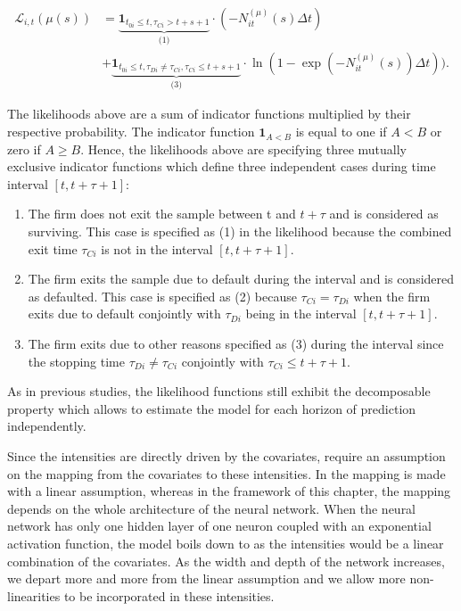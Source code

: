 \begin{align} \label{small_lik_h}
\mathcal{L}_{i,t}(\mu(s)) &= \underbrace{\textbf{1}_{t_{0i} \leq t,\tau_{Ci} > t + s +1}}_\textrm{(1)} \cdot (-N_{it}^{(\mu)}(s) \Delta t)\\ \nonumber
&+ \underbrace{\textbf{1}_{t_{0i} \leq t, \tau_{Di} \neq \tau_{Ci}, \tau_{Ci} \leq t+s+1}}_\textrm{(3)} \cdot \ln(1-\exp(-N_{it}^{(\mu)}(s))\Delta t)).
\end{align}

The likelihoods above are a sum of indicator functions multiplied by their respective probability. The indicator function $\textbf{1}_{A<B}$ is equal to one if $A<B$ or zero if $A \geq B$. Hence, the likelihoods above are specifying three mutually exclusive indicator functions which define three independent cases during time interval $[t,t+\tau+1]$:
\begin{enumerate}
\item The firm does not exit the sample between t and $t+\tau$ and is considered as surviving. This case is specified as (1) in the likelihood because the combined exit time $\tau_{Ci}$ is not in the interval $[t,t+\tau+1]$.
\item The firm exits the sample due to default during the interval and is considered as defaulted. This case is specified as (2) because $\tau_{Ci}=\tau_{Di}$ when the firm exits due to default conjointly with $\tau_{Di}$ being in the interval $[t,t+\tau+1]$.
\item The firm exits due to other reasons specified as (3) during the interval since the stopping time $\tau_{Di} \neq \tau_{Ci}$ conjointly with $\tau_{Ci} \leq t+\tau+1$.
\end{enumerate}

As in previous studies, the likelihood functions still exhibit the decomposable property which allows to estimate the model for each horizon of prediction independently.

Since the intensities are directly driven by the covariates, \citet{Duan2012} require an assumption on the mapping from the covariates to these intensities. In \citet{Duan2012} the mapping is made with a linear assumption, whereas in the framework of this chapter, the mapping depends on the whole architecture of the neural network. When the neural network has only one hidden layer of one neuron coupled with an exponential activation function, the model boils down to \citet{Duan2012} as the intensities would be a linear combination of the covariates. As the width and depth of the network increases, we depart more and more from the linear assumption and we allow more non-linearities to be incorporated in these intensities. \\ 


